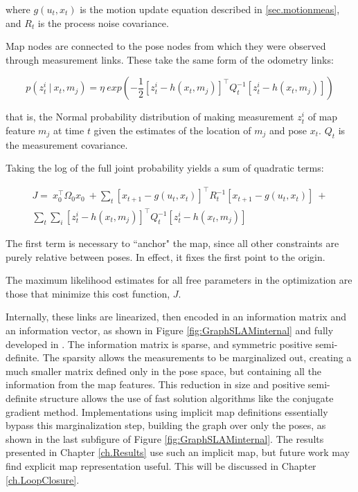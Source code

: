 where $g\left(u_t,x_t\right)$ is the motion update equation described in \ref{sec.motionmeas}, and $R_t$ is the process noise covariance.

Map nodes are connected to the pose nodes from which they were observed through measurement links. These take the same form of the odometry links:

\begin{equation}
p\left(z^i_{t}~|~x_t,m_j\right) = \eta~ exp\left(-\frac{1}{2}\left[z^i_{t} - h\left(x_t,m_j\right)\right]^{\intercal}Q_t^{-1}\left[z^i_{t} - h\left(x_t,m_j\right)\right]\right)
\label{eq.measModel}
\end{equation}

that is, the Normal probability distribution of making measurement $z^i_t$ of map feature $m_j$ at time $t$ given the estimates of the location of $m_j$ and pose $x_t$. $Q_t$ is the measurement covariance. 

Taking the log of the full joint probability yields a sum of quadratic terms:

\begin{multline}
J = ~x_0^{\intercal}\Omega_0 x_0 ~+
\sum_{t}{\left[x_{t+1} - g\left(u_t,x_t\right)\right]^{\intercal}R_t^{-1}\left[x_{t+1} - g\left(u_t,x_t\right)\right]} ~+ \\ \sum_{t}{\sum_{i}{\left[z^i_{t} - h\left(x_t,m_j\right)\right]^{\intercal}Q_t^{-1}\left[z^i_{t} - h\left(x_t,m_j\right)\right]}}
\label{eq.quadcost}
\end{multline}

The first term is necessary to ``anchor" the map, since all other constraints are purely relative between poses. In effect, it fixes the first point to the origin. 

The maximum likelihood estimates for all free parameters in the optimization are those that minimize this cost function, $J$.

Internally, these links are linearized, then encoded in an information matrix and an information vector, as shown in Figure \ref{fig:GraphSLAMinternal} and fully developed in \cite{ref?}. The information matrix is sparse, and symmetric positive semi-definite. The sparsity allows the measurements to be marginalized out, creating a much smaller matrix defined only in the pose space, but containing all the information from the map features. This reduction in size and positive semi-definite structure allows the use of fast solution algorithms like the conjugate gradient method. Implementations using implicit map definitions essentially bypass this marginalization step, building the graph over only the poses, as shown in the last subfigure of Figure \ref{fig:GraphSLAMinternal}. The results presented in Chapter \ref{ch.Results} use such an implicit map, but future work may find explicit map representation useful. This will be discussed in Chapter \ref{ch.LoopClosure}.

